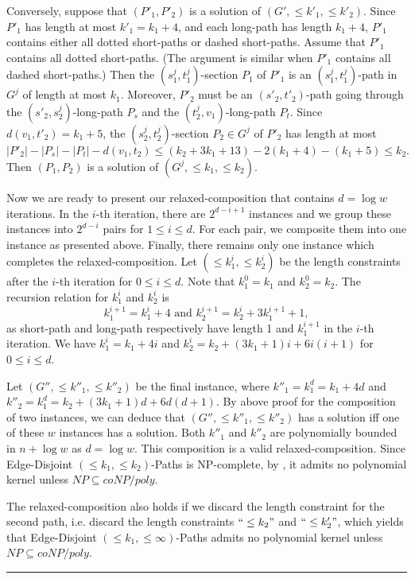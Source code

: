 \documentclass{llncs}
\def\qed{\rule{1.5mm}{3mm}}
\begin{document}
{	Conversely, suppose that $(P'_1, P'_2)$ is a solution of $(G', \le k'_1, \le k'_2)$. 
	Since $P'_1$ has length at most $k'_1 = k_1 + 4$, and each long-path has length $k_1 + 4$, 
	$P'_1$ contains either all dotted short-paths or dashed short-paths. 
	Assume that $P'_1$ contains all dotted short-paths. 
	(The argument is similar when $P'_1$ contains all dashed short-paths.)
	Then the $(s^j_1, t^j_1)$-section $P_1$ of $P'_1$ is an $(s^j_1, t^j_1)$-path in $G^j$ of length at most $k_1$. 
	Moreover, $P'_2$ must be an $(s'_2, t'_2)$-path going through 
	the $(s'_2, s^j_2)$-long-path $P_s$ and the $(t^j_2, v_1)$-long-path $P_t$.
	Since $d(v_1, t'_2) = k_1 + 5$, the $(s^j_2, t^j_2)$-section $P_2 \in G^j$ of $P'_2$ has length at most 
	\[|P'_2| - |P_s| - |P_t| - d(v_1, t_2) \le (k_2 + 3k_1 + 13) - 2(k_1 + 4) - (k_1 + 5) \le k_2.\]
	Then $(P_1, P_2)$ is a solution of $(G^j, \le k_1, \le k_2)$. 
	

	Now we are ready to present our relaxed-composition that contains $d = \log w$ iterations.
	In the $i$-th iteration, there are $2^{d - i + 1}$ instances and 
	we group these instances into $2^{d - i}$ pairs for $1 \le i \le d$. 
	For each pair, we composite them into one instance as presented above. 
	Finally, there remains only one instance which completes the relaxed-composition.
	Let $(\le k^i_1, \le k^i_2)$ be the length constraints after the $i$-th iteration for $0 \le i \le d$. 
	Note that $k^0_1 = k_1$ and $k^0_2 = k_2$. 
	The recursion relation for $k^i_1$ and $k^i_2$ is 
	\[ k^{i + 1}_1 = k^i_1 + 4 \mbox{ and } k^{i + 1}_2 = k^i_2 + 3k^{i + 1}_1 + 1, \] 
	as short-path and long-path respectively have length 1 and $k_1^{i + 1}$ in the $i$-th iteration. 
	We have $k^i_1 = k_1 + 4i$ and $k^i_2 = k_2 + (3k_1 + 1)i + 6i(i + 1)$ for $0 \le i \le d$. 
	
	Let $(G'', \le k''_1, \le k''_2)$ be the final instance, 
	where $k''_1 = k^d_1 = k_1 + 4d$ and $k''_2 = k^d_1 = k_2 + (3k_1 + 1)d + 6d(d + 1)$. 
	By above proof for the composition of two instances, 
	we can deduce that $(G'', \le k''_1, \le k''_2)$ has a solution 
	iff one of these $w$ instances has a solution. 
	Both $k''_1$ and $k''_2$ are polynomially bounded in $n + \log w$ as $d = \log w$. 
	This composition is a valid relaxed-composition. 
	Since {\sc Edge-Disjoint $(\le k_1, \le k_2)$-Paths} is NP-complete, by , 
	it admits no polynomial kernel unless $NP \subseteq coNP/poly$. 
	
	The relaxed-composition also holds if we discard the length constraint for the second path, i.e. 
	discard the length constraints $``\le k_2"$ and $``\le k'_2"$, 
	which yields that {\sc Edge-Disjoint $(\le k_1, \le \infty)$-Paths} 
	admits no polynomial kernel unless $NP \subseteq coNP/poly$.
	\qed} 
\end{document}
